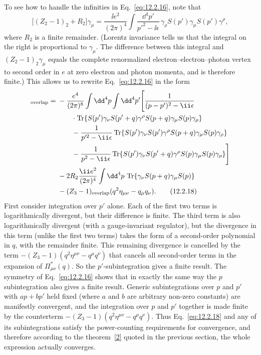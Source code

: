 To see how to handle the infinities in Eq.~\eqref{eq:12.2.16}, note that
\begin{equation}
  \bigl[(Z_2-1)_2+R_2\bigr]\gamma_\mu
  =\frac{\ii e^2}{(2\pi)^4}\int\frac{\dd^4p'}{p'^2-\ii\epsilon}\,
  \gamma_\rho S(p')\gamma_\mu S(p')\gamma^\rho,
  \tag{12.2.17}\label{eq:12.2.17}
\end{equation}
where $R_2$ is a finite remainder. (Lorentz invariance tells us that the
integral on the right is proportional to $\gamma_\mu$. The difference
between this integral and $(Z_2-1)_2\gamma_\mu$ equals the complete
renormalized electron--electron--photon vertex to second order in $e$ at
zero electron and photon momenta, and is therefore finite.) This allows us
to rewrite Eq.~\eqref{eq:12.2.16} in the form
\begin{align}
 [\Pi_{\mu\nu}^*(q)]_{\mathrm{overlap}}
 ={}&-\frac{e^4}{(2\pi)^8}\int \dd^4p\int \dd^4p'
 \Biggl[
 \frac{1}{(p-p')^2-\ii\epsilon}
 \notag\\
 &\qquad\cdot
 \operatorname{Tr}\!\left\{S(p')\gamma_\nu S(p'+q)\gamma^\rho
 S(p+q)\gamma_\mu S(p)\gamma_\rho\right\}
 \notag\\
 &\qquad-\frac{1}{p'^2-\ii\epsilon}
 \operatorname{Tr}\!\left\{S(p')\gamma_\nu S(p')\gamma^\rho
 S(p+q)\gamma_\mu S(p)\gamma_\rho\right\}
 \notag\\
 &\qquad-\frac{1}{p^2-\ii\epsilon}
 \operatorname{Tr}\!\left\{S(p')\gamma_\nu S(p'+q)\gamma^\rho
 S(p)\gamma_\mu S(p)\gamma_\rho\right\}
 \Biggr]
 \notag\\
 &-2R_2\frac{\ii e^2}{(2\pi)^4}\int \dd^4p\,
 \operatorname{Tr}\!\left\{\gamma_\nu S(p+q)\gamma_\mu S(p)\right\}
 \notag\\
 &-(Z_3-1)_{\mathrm{overlap}}
 (q^2\eta_{\mu\nu}-q_\mu q_\nu).
 \tag{12.2.18}\label{eq:12.2.18}
\end{align}
First consider integration over $p'$ alone. Each of the first two terms is
logarithmically divergent, but their difference is finite. The third term is
also logarithmically divergent (with a gauge-invariant regulator), but the
divergence in this term (unlike the first two terms) takes the form of a
second-order polynomial in $q$, with the remainder finite. This remaining
divergence is cancelled by the term
$-(Z_3-1)(q^2\eta^{\mu\nu}-q^\mu q^\nu)$ that cancels all second-order terms
in the expansion of $\Pi_{\mu\nu}^*(q)$. So the $p'$-subintegration gives a
finite result. The symmetry of Eq.~\eqref{eq:12.2.16} shows that in exactly
the same way the $p$ subintegration also gives a finite result. Generic
subintegrations over $p$ and $p'$ with $ap+bp'$ held fixed (where $a$ and
$b$ are arbitrary non-zero constants) are manifestly convergent, and the
integration over $p$ and $p'$ together is made finite by the counterterm
$-(Z_3-1)(q^2\eta^{\mu\nu}-q^\mu q^\nu)$. Thus Eq.~\eqref{eq:12.2.18} and any of its
subintegrations satisfy the power-counting requirements for convergence,
and therefore according to the theorem~\hyperref[ref:12.2]{[2]} quoted in
the previous section, the whole expression actually converges.

